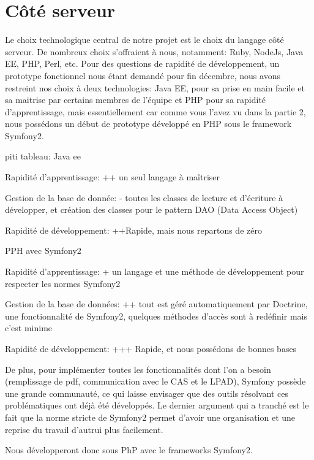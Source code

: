 \section{Côté serveur}
Le choix technologique central de notre projet est le choix du langage côté serveur. De nombreux choix s'offraient à nous, notamment: Ruby, NodeJs, Java EE, PHP, Perl, etc.
Pour des questions de rapidité de développement, un prototype fonctionnel nous étant demandé pour fin décembre, nous avons restreint nos choix à deux technologies: Java EE, pour sa prise en main facile et sa maitrise par certains membres de l'équipe et PHP pour sa rapidité d'apprentissage, mais essentiellement car comme vous l'avez vu dans la partie 2, nous possédons un début de prototype développé en PHP sous le framework Symfony2.

piti tableau:
Java ee 
                       
Rapidité d'apprentissage:     ++ un seul langage à maîtriser
 
Gestion de la base de donnée:  - toutes les classes de lecture et d'écriture à développer, et création des classes pour le pattern DAO (Data Access Object)

Rapidité de développement: ++Rapide, mais nous repartons de zéro


PPH avec Symfony2
  
Rapidité d'apprentissage:   + un langage et une méthode de développement pour respecter les normes Symfony2

Gestion de la base de données:  ++ tout est géré automatiquement par Doctrine, une fonctionnalité de Symfony2, quelques méthodes d'accès sont à redéfinir mais c'est minime

Rapidité de développement: +++ Rapide, et nous possédons de bonnes bases

De plus, pour implémenter toutes les fonctionnalités dont l'on a besoin (remplissage de pdf, communication avec le CAS et le LPAD), Symfony possède une grande communauté, ce qui laisse envisager que des outils résolvant ces problématiques ont déjà été développés.
Le dernier argument qui a tranché est le fait que la norme stricte de Symfony2 permet d'avoir une organisation et une reprise du travail d'autrui plus facilement.

Nous développeront donc sous PhP avec le frameworks Symfony2.